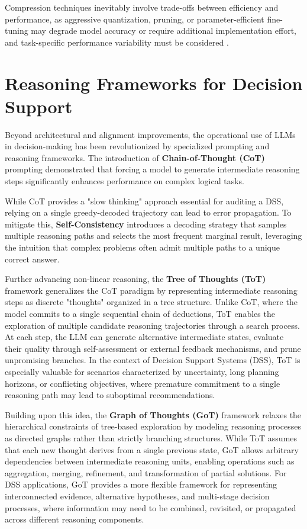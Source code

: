 Compression techniques inevitably involve trade-offs between efficiency and performance, as aggressive quantization, pruning, or parameter-efficient fine-tuning may degrade model accuracy or require additional implementation effort, and task-specific performance variability must be considered \cite{frantar2022gptq, awq, hu2022lora, gordon2020compressing}.






\section{Reasoning Frameworks for Decision Support} \label{sec: reasoning_frameworks}
Beyond architectural and alignment improvements, the operational use of LLMs in decision-making has been revolutionized by specialized prompting and reasoning frameworks. The introduction of \textbf{Chain-of-Thought (CoT)} prompting \cite{wei2022chain} demonstrated that forcing a model to generate intermediate reasoning steps significantly enhances performance on complex logical tasks. 

While CoT provides a "slow thinking" approach essential for auditing a DSS, relying on a single greedy-decoded trajectory can lead to error propagation. To mitigate this, \textbf{Self-Consistency} \cite{wang2022self} introduces a decoding strategy that samples multiple reasoning paths and selects the most frequent marginal result, leveraging the intuition that complex problems often admit multiple paths to a unique correct answer.


Further advancing non-linear reasoning, the \textbf{Tree of Thoughts (ToT)} framework \cite{yao2023tree} generalizes the CoT paradigm by representing intermediate reasoning steps as discrete "thoughts" organized in a tree structure. Unlike CoT, where the model commits to a single sequential chain of deductions, ToT enables the exploration of multiple candidate reasoning trajectories through a search process. At each step, the LLM can generate alternative intermediate states, evaluate their quality through self-assessment or external feedback mechanisms, and prune unpromising branches. In the context of Decision Support Systems (DSS), ToT is especially valuable for scenarios characterized by uncertainty, long planning horizons, or conflicting objectives, where premature commitment to a single reasoning path may lead to suboptimal recommendations.

Building upon this idea, the \textbf{Graph of Thoughts (GoT)} framework \cite{besta2024graph} relaxes the hierarchical constraints of tree-based exploration by modeling reasoning processes as directed graphs rather than strictly branching structures. While ToT assumes that each new thought derives from a single previous state, GoT allows arbitrary dependencies between intermediate reasoning units, enabling operations such as aggregation, merging, refinement, and transformation of partial solutions. For DSS applications, GoT provides a more flexible framework for representing interconnected evidence, alternative hypotheses, and multi-stage decision processes, where information may need to be combined, revisited, or propagated across different reasoning components.



